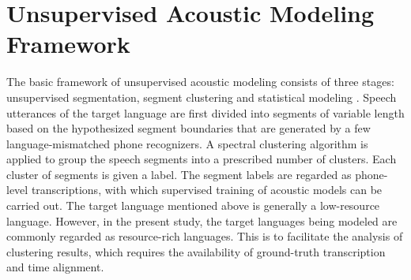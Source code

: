 \documentclass[a4paper]{article}
\newcommand{\etal}{\textit{et al}.~}
\begin{document}





\section{Unsupervised Acoustic Modeling Framework}
\label{lmphnrec}
The basic framework of unsupervised acoustic modeling consists of three stages: unsupervised segmentation, segment clustering and statistical modeling \cite{feng2016exploit}.
Speech utterances of the target language are first divided into segments of variable length based on the hypothesized segment boundaries that are generated by a few language-mismatched phone recognizers. A spectral clustering algorithm is applied to group the speech segments into a prescribed number of clusters. Each cluster of segments is given a label. The segment labels are regarded as phone-level transcriptions, with which supervised training of acoustic models can be carried out.
The target language mentioned above is generally a low-resource language. However, in the present study, the target languages being modeled are commonly regarded as resource-rich languages. This is to facilitate the analysis of clustering results, which requires the availability of ground-truth transcription and time alignment. 
\end{document}
